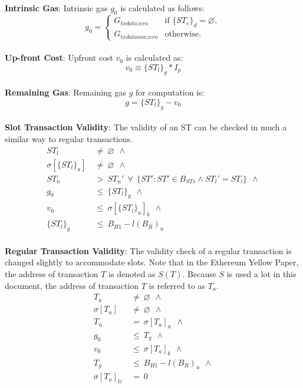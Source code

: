 \documentclass{article}
\begin{document}
\\\\
\textbf{Intrinsic Gas}: Intrinsic gas $g_0$ is calculated as follows: 
\begin{equation*}
g_0 = 
\begin{cases}
G_{txdatazero}    &\text{if } \{ST_e\}_d=\varnothing,\\
G_{txdatanonzero} &\text{otherwise.}
\end{cases}
\end{equation*}
\\
\textbf{Up-front Cost}: Upfront cost $v_0$ is calculated as:
\begin{equation*}
    v_0 \equiv \{ST_l\}_g * I_p
\end{equation*}
\\
\textbf{Remaining Gas}: Remaining gas $g$ for computation is:
\begin{equation*}
    g = \{ST_l\}_g - v_0
\end{equation*}
\\
\textbf{Slot Transaction Validity}: The validity of an ST can be checked in much a similar way to regular transactions.
\begin{align*}
    ST_l \ &\neq \ \varnothing \ \ \land \\
    \sigma[\{ST_l\}_a] \ &\neq \ \varnothing \ \ \land \\
    ST_n \ &> \ ST_n' \ \ \forall \ \ \{ST': ST'\in B_{STs} \land ST_l' =  ST_l\} \ \ \land \\
    g_0 \ &\leq \ \{ST_l\}_g \ \ \land \\
    v_0 \ &\leq \ \sigma[\{ST_l\}_a]_b \ \ \land \\
    \{ST_l\}_g \ &\leq \ B_{H1} - l(B_R)_u
\end{align*}
\\
\textbf{Regular Transaction Validity}: The validity check of a regular transaction is changed slightly to accommodate slots. Note that in the Ethereum Yellow Paper, the address of transaction $T$ is denoted as $S(T)$. Because $S$ is used a lot in this document, the address of transaction $T$ is referred to as $T_a$.
\begin{align*}
    T_a \ &\neq \ \varnothing \ \ \land \\
    \sigma[T_a] \ &\neq \ \varnothing \ \ \land \\
    T_n \ &= \ \sigma[T_a]_n \ \ \land \\
    g_0 \ &\leq \ T_g \ \ \land \\
    v_0 \ &\leq \ \sigma[T_a]_b \ \ \land \\
    T_g \ &\leq \ B_{H1} - l(B_R)_u \ \ \land \\
    \sigma[T_a]_{lc} \ &= \ 0 \\ 
\end{align*}
\end{document}
